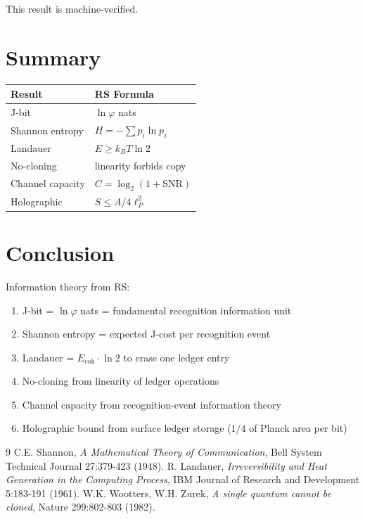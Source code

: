 \documentclass[12pt,a4paper]{article}
\theoremstyle{definition}
\theoremstyle{remark}
\begin{document}
This result is machine-verified.

\section{Summary}

\begin{center}
\begin{tabular}{ll}
\hline
\textbf{Result} & \textbf{RS Formula} \\
\hline
J-bit & $\ln\varphi$ nats \\
Shannon entropy & $H = -\sum p_i \ln p_i$ \\
Landauer & $E \geq k_B T \ln 2$ \\
No-cloning & linearity forbids copy \\
Channel capacity & $C = \log_2(1 + \mathrm{SNR})$ \\
Holographic & $S \leq A/4\ell_P^2$ \\
\hline
\end{tabular}
\end{center}

\section{Conclusion}

Information theory from RS:
\begin{enumerate}
\item J-bit = $\ln\varphi$ nats = fundamental recognition information unit
\item Shannon entropy = expected J-cost per recognition event
\item Landauer = $E_\mathrm{coh} \cdot \ln 2$ to erase one ledger entry
\item No-cloning from linearity of ledger operations
\item Channel capacity from recognition-event information theory
\item Holographic bound from surface ledger storage ($1/4$ of Planck area per bit)
\end{enumerate}

\begin{thebibliography}{9}
 C.E. Shannon, \emph{A Mathematical Theory of Communication}, 
Bell System Technical Journal 27:379-423 (1948).
 R. Landauer, \emph{Irreversibility and Heat Generation in the Computing Process}, 
IBM Journal of Research and Development 5:183-191 (1961).
 W.K. Wootters, W.H. Zurek, \emph{A single quantum cannot be cloned}, 
Nature 299:802-803 (1982).
\end{thebibliography}
\end{document}
